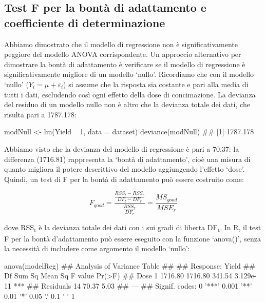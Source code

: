 \documentclass[a4paper,12pt,oneside]{book}
\newenvironment{Shaded}{}{}
\newcommand{\KeywordTok}[1]{#1}
\newcommand{\DataTypeTok}[1]{#1}
\newcommand{\DecValTok}[1]{#1}
\newcommand{\StringTok}[1]{#1}
\newcommand{\CommentTok}[1]{#1}
\newcommand{\OperatorTok}[1]{#1}
\newcommand{\NormalTok}[1]{#1}
\begin{document}
\hypertarget{test-f-per-la-bonta-di-adattamento-e-coefficiente-di-determinazione}{%
\subsection{Test F per la bontà di adattamento e coefficiente di determinazione}\label{test-f-per-la-bonta-di-adattamento-e-coefficiente-di-determinazione}}

Abbiamo dimostrato che il modello di regressione non è significativamente peggiore del modello ANOVA corrispondente. Un approccio alternativo per dimostrare la bontà di adattamento è verificare se il modello di regressione è significativamente migliore di un modello `nullo'. Ricordiamo che con il modello `nullo' (\(Y_i = \mu + \varepsilon_i\)) si assume che la risposta sia costante e pari alla media di tutti i dati, escludendo così ogni effetto della dose di concimazione. La devianza del residuo di un modello nullo non è altro che la devianza totale dei dati, che risulta pari a 1787.178:

\begin{Shaded}
\begin{Highlighting}[]
\NormalTok{modNull <-}\StringTok{ }\KeywordTok{lm}\NormalTok{(Yield }\OperatorTok{~}\StringTok{ }\DecValTok{1}\NormalTok{, }\DataTypeTok{data =}\NormalTok{ dataset)}
\KeywordTok{deviance}\NormalTok{(modNull)}
\CommentTok{## [1] 1787.178}
\end{Highlighting}
\end{Shaded}

Abbiamo visto che la devianza del modello di regressione è pari a 70.37: la differenza (1716.81) rappresenta la `bontà di adattamento', cioè una misura di quanto migliora il potere descrittivo del modello aggiungendo l'effetto `dose'. Quindi, un test di F per la bontà di adattamento può essere costruito come:

\[ F_{good} = \frac{\frac{RSS_t - RSS_r}{DF_t - DF_r} } {\frac{RSS_r}{DF_r}} = \frac{MS_{good}}{MSE_r}\]

dove RSS\textsubscript{t} è la devianza totale dei dati con i sui gradi di liberta DF\textsubscript{t}. In R, il test F per la bontà d'adattamento può essere eseguito con la funzione `anova()', senza la necessità di includere come argomento il modello `nullo':

\begin{Shaded}
\begin{Highlighting}[]
\KeywordTok{anova}\NormalTok{(modelReg)}
\CommentTok{## Analysis of Variance Table}
\CommentTok{## }
\CommentTok{## Response: Yield}
\CommentTok{##           Df  Sum Sq Mean Sq F value    Pr(>F)    }
\CommentTok{## Dose       1 1716.80 1716.80  341.54 3.129e-11 ***}
\CommentTok{## Residuals 14   70.37    5.03                      }
\CommentTok{## ---}
\CommentTok{## Signif. codes:  0 '***' 0.001 '**' 0.01 '*' 0.05 '.' 0.1 ' ' 1}
\end{Highlighting}
\end{Shaded}
\end{document}
